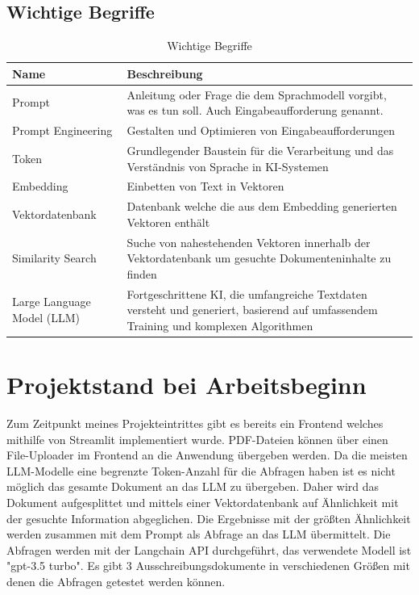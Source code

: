 \subsection{Wichtige Begriffe}

\begin{table}[H]
    \centering
    \caption{Wichtige Begriffe}
    \label{tab:technologien}
    \begin{tabular}{|>{\centering\arraybackslash}m{4cm}|p{10cm}|} %
    \hline
    \textbf{Name} & \textbf{Beschreibung} \\ \hline
    Prompt & Anleitung oder Frage die dem Sprachmodell vorgibt, was es tun soll. Auch Eingabeaufforderung genannt. \\ \hline
    Prompt Engineering & Gestalten und Optimieren von Eingabeaufforderungen \\ \hline
    Token & Grundlegender Baustein für die Verarbeitung und das Verständnis von Sprache in KI-Systemen  \\ \hline
    Embedding & Einbetten von Text in Vektoren \\ \hline
    Vektordatenbank & Datenbank welche die aus dem Embedding generierten Vektoren enthält \\ \hline
    Similarity Search & Suche von nahestehenden Vektoren innerhalb der Vektordatenbank um gesuchte Dokumenteninhalte zu
    finden \\ \hline
    Large Language Model (LLM) & Fortgeschrittene KI, die umfangreiche Textdaten versteht und generiert, basierend auf umfassendem Training und komplexen Algorithmen \\ \hline
    \end{tabular}
\end{table}

\section{Projektstand bei Arbeitsbeginn}
Zum Zeitpunkt meines Projekteintrittes gibt es bereits ein Frontend welches mithilfe von Streamlit implementiert wurde.
PDF-Dateien können über einen File-Uploader im Frontend an die Anwendung übergeben werden. Da die meisten LLM-Modelle
eine begrenzte Token-Anzahl für die Abfragen haben ist es nicht möglich das gesamte Dokument an das LLM zu übergeben.
Daher wird das Dokument aufgesplittet und mittels einer Vektordatenbank auf Ähnlichkeit mit der gesuchte Information
abgeglichen. Die Ergebnisse mit der größten Ähnlichkeit werden zusammen mit dem Prompt als Abfrage an das LLM
übermittelt. Die Abfragen werden mit der Langchain API durchgeführt, das verwendete Modell ist "gpt-3.5 turbo". Es gibt
3 Ausschreibungsdokumente in verschiedenen Größen mit denen die Abfragen getestet werden können.

